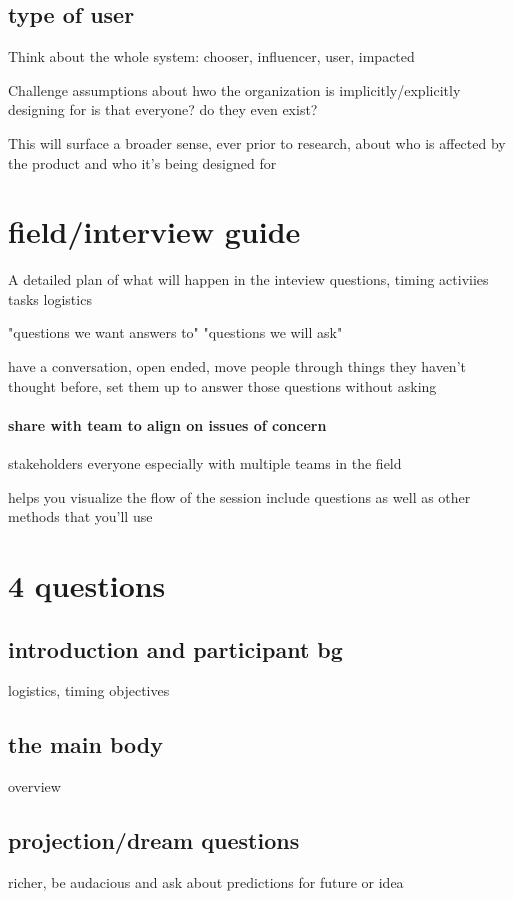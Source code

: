 \documentclass{article}
\begin{document}
\subsection{type of user}
Think about the whole system: chooser, influencer, user, impacted

Challenge assumptions about hwo the organization is implicitly/explicitly designing for
is that everyone?
do they even exist?

This will surface a broader sense, ever prior to research, about who is affected by the product and who it's being designed for

\section{field/interview guide}
A detailed plan of what will happen in the inteview
questions, timing activiies tasks logistics

\begin{framed}
"questions we want answers to"
"questions we will ask"
\end{framed}

have a conversation, open ended, move people through things they haven't thought before, set them up to answer those questions without asking

\paragraph{share with team to align on issues of concern}
stakeholders everyone
especially with multiple teams in the field

helps you visualize the flow of the session
include questions as well as other methods that you'll use


\section{4 questions}
\subsection{introduction and participant bg}
logistics, timing objectives
\subsection{the main body}
overview
\subsection{projection/dream questions}
richer, be audacious and ask about predictions for future or idea
\end{document}

